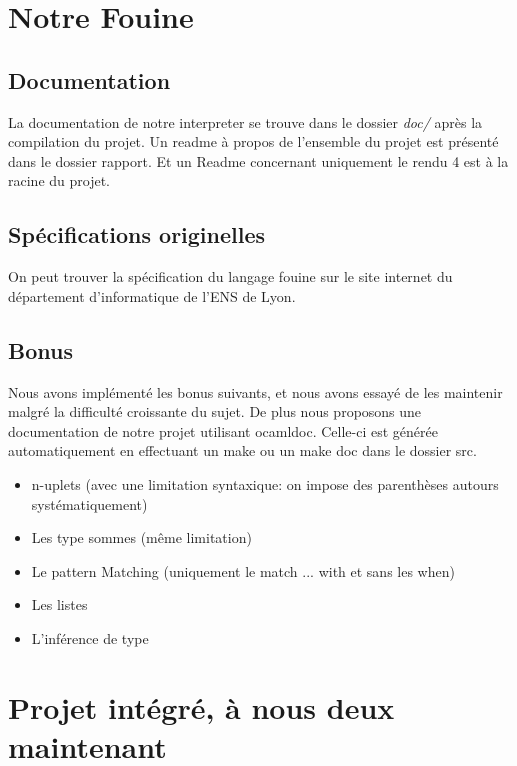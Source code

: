 \documentclass{article}
\begin{document}
	\section{Notre Fouine}
	
	\subsection{Documentation}
	
	La documentation de notre interpreter se trouve dans le dossier \emph{doc/} après la compilation du projet. Un readme à propos de l'ensemble du projet est présenté dans le dossier rapport. Et un Readme concernant uniquement le rendu 4 est à la racine du projet.
	
	\subsection{Spécifications originelles}
	
	On peut trouver la spécification du langage fouine sur le site internet du département d'informatique de l'ENS de Lyon\cite{di:fouine}.
	
	\subsection{Bonus}
	
	Nous avons implémenté les bonus suivants, et nous avons essayé de les maintenir malgré la difficulté croissante du sujet. De plus nous proposons une documentation de notre projet utilisant ocamldoc. Celle-ci est générée automatiquement en effectuant un make ou un make doc dans le dossier src.
	
	\begin{itemize}
		\item n-uplets (avec une limitation syntaxique: on impose des parenthèses autours systématiquement)
		\item Les type sommes (même limitation)
		\item Le pattern Matching (uniquement le match ... with et sans les when)
		\item Les listes
		\item L'inférence de type
	\end{itemize}



\section{Projet intégré, à nous deux maintenant}
	
\end{document}

